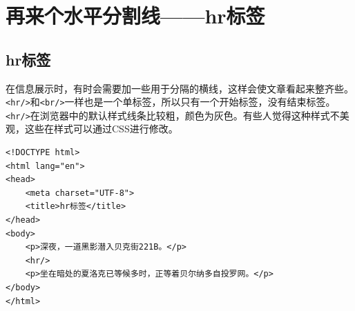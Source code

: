 \newpage

\section{再来个水平分割线——hr标签}

\subsection{hr标签}

在信息展示时，有时会需要加一些用于分隔的横线，这样会使文章看起来整齐些。 \\

\lstinline|<hr/>|和\lstinline|<br/>|一样也是一个单标签，所以只有一个开始标签，没有结束标签。 \\

\lstinline|<hr/>|在浏览器中的默认样式线条比较粗，颜色为灰色。有些人觉得这种样式不美观，这些在样式可以通过CSS进行修改。

\begin{lstlisting}[style=htmlcssjs, title=hr标签]
<!DOCTYPE html>
<html lang="en">
<head>
    <meta charset="UTF-8">
    <title>hr标签</title>
</head>
<body>
    <p>深夜，一道黑影潜入贝克街221B。</p>
    <hr/>
    <p>坐在暗处的夏洛克已等候多时，正等着贝尔纳多自投罗网。</p>
</body>
</html>
\end{lstlisting}

\newpage